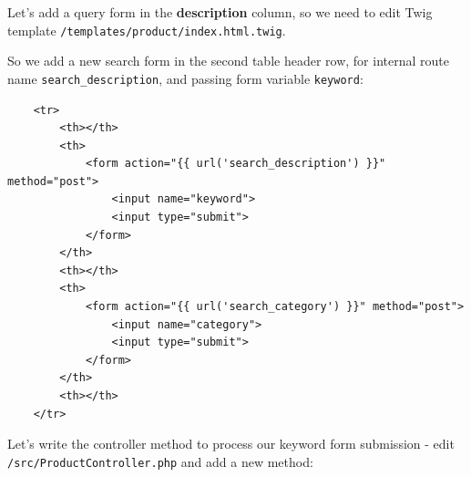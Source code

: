\documentclass[a4paperpaper,openright]{book}
\newenvironment{Shaded}{}{}
\newcommand{\AnnotationTok}[1]{\textcolor[rgb]{0.38,0.63,0.69}{\textbf{\textit{#1}}}}
\newcommand{\CommentTok}[1]{\textcolor[rgb]{0.38,0.63,0.69}{\textit{#1}}}
\newcommand{\KeywordTok}[1]{\textcolor[rgb]{0.00,0.44,0.13}{\textbf{#1}}}
\newcommand{\NormalTok}[1]{#1}
\newcommand{\OtherTok}[1]{\textcolor[rgb]{0.00,0.44,0.13}{#1}}
\newcommand{\StringTok}[1]{\textcolor[rgb]{0.25,0.44,0.63}{#1}}
\begin{document}
Let's add a query form in the \textbf{description} column, so we need to
edit Twig template \texttt{/templates/product/index.html.twig}.

So we add a new search form in the second table header row, for internal
route name \texttt{search\_description}, and passing form variable
\texttt{keyword}:

\begin{verbatim}
    <tr>
        <th></th>
        <th>
            <form action="{{ url('search_description') }}" method="post">
                <input name="keyword">
                <input type="submit">
            </form>
        </th>
        <th></th>
        <th>
            <form action="{{ url('search_category') }}" method="post">
                <input name="category">
                <input type="submit">
            </form>
        </th>
        <th></th>
    </tr>
\end{verbatim}

Let's write the controller method to process our keyword form submission
- edit \texttt{/src/ProductController.php} and add a new method:

\begin{Shaded}
\end{Shaded}
\end{document}
